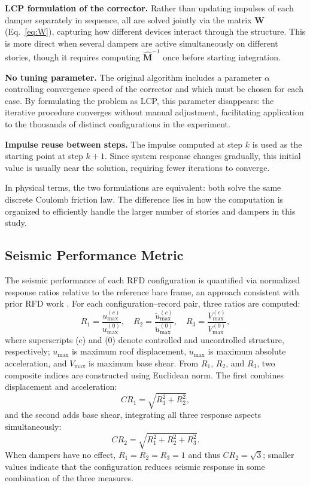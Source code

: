 \documentclass[preprint,12pt,authoryear]{elsarticle}
\begin{document}
\textbf{LCP formulation of the corrector.}
Rather than updating impulses of each damper separately in sequence, all are solved jointly via the
matrix $\bm{W}$ (Eq.~\ref{eq:W}), capturing how different devices interact through the structure.
This is more direct when several dampers are active simultaneously on different stories, though it
requires computing $\hat{\bm{M}}^{-1}$ once before starting integration.

\textbf{No tuning parameter.}
The original algorithm includes a parameter $\alpha$ controlling convergence speed of the corrector
and which must be chosen for each case. By formulating the problem as LCP, this parameter disappears:
the iterative procedure converges without manual adjustment, facilitating application to the thousands
of distinct configurations in the experiment.

\textbf{Impulse reuse between steps.}
The impulse computed at step $k$ is used as the starting point at step $k+1$. Since system response
changes gradually, this initial value is usually near the solution, requiring fewer iterations to
converge.

In physical terms, the two formulations are equivalent: both solve the same discrete Coulomb friction
law. The difference lies in how the computation is organized to efficiently handle the larger number
of stories and dampers in this study.

\subsection{Seismic Performance Metric}
\label{sec:theory:metrica}

The seismic performance of each RFD configuration is quantified via normalized response ratios relative
to the reference bare frame, an approach consistent with prior RFD work \citep{Namorado2024, Jarrahi2020jbe, Mualla2002}.
For each configuration--record pair, three ratios are computed:
\begin{equation}
    R_1 = \frac{u_{\max}^{(c)}}{u_{\max}^{(0)}}, \quad
    R_2 = \frac{\ddot{u}_{\max}^{(c)}}{\ddot{u}_{\max}^{(0)}}, \quad
    R_3 = \frac{V_{\max}^{(c)}}{V_{\max}^{(0)}},
    \label{eq:R_individual}
\end{equation}
where superscripts (c) and (0) denote controlled and uncontrolled structure, respectively; $u_{\max}$
is maximum roof displacement, $\ddot{u}_{\max}$ is maximum absolute acceleration, and $V_{\max}$ is
maximum base shear. From $R_1$, $R_2$, and $R_3$, two composite indices are constructed using
Euclidean norm. The first combines displacement and acceleration:
\begin{equation}
    CR_1 = \sqrt{R_1^2 + R_2^2},
    \label{eq:CR1}
\end{equation}
and the second adds base shear, integrating all three response aspects simultaneously:
\begin{equation}
    CR_2 = \sqrt{R_1^2 + R_2^2 + R_3^2}.
    \label{eq:CR2}
\end{equation}
When dampers have no effect, $R_1 = R_2 = R_3 = 1$ and thus $CR_2 = \sqrt{3}$; smaller values indicate
that the configuration reduces seismic response in some combination of the three measures.
\end{document}
